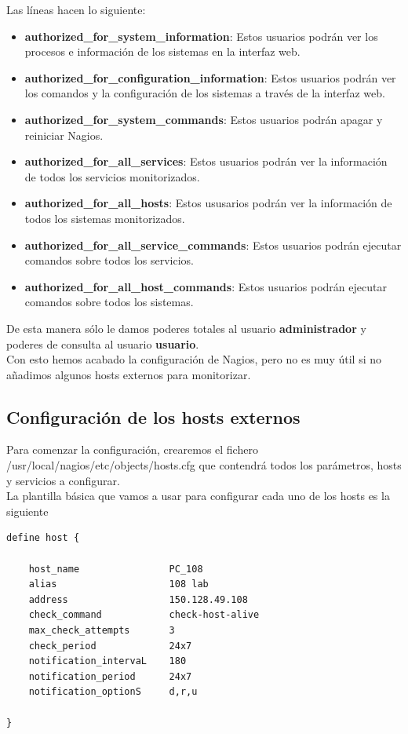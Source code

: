 \documentclass[11pt,a4paper]{article}
\begin{document}
Las líneas hacen lo siguiente:

\begin{itemize}
\item \textbf{authorized\_for\_system\_information}: Estos usuarios podrán ver los procesos e información de los sistemas en la interfaz web.
\item \textbf{authorized\_for\_configuration\_information}: Estos usuarios podrán ver los comandos y la configuración de los sistemas a través de la interfaz web.
\item \textbf{authorized\_for\_system\_commands}: Estos usuarios podrán apagar y reiniciar Nagios.
\item \textbf{authorized\_for\_all\_services}: Estos usuarios podrán ver la información de todos los servicios monitorizados.
\item \textbf{authorized\_for\_all\_hosts}: Estos ususarios podrán ver la información de todos los sistemas monitorizados.
\item \textbf{authorized\_for\_all\_service\_commands}: Estos usuarios podrán ejecutar comandos sobre todos los servicios.
\item \textbf{authorized\_for\_all\_host\_commands}: Estos usuarios podrán ejecutar comandos sobre todos los sistemas.
\end{itemize}

De esta manera sólo le damos poderes totales al usuario \textbf{administrador} y poderes de consulta al usuario \textbf{usuario}.
\\

Con esto hemos acabado la configuración de Nagios, pero no es muy útil si no añadimos algunos hosts externos para monitorizar.

\subsection{Configuración de los hosts externos}

Para comenzar la configuración, crearemos el fichero /usr/local/nagios/etc/objects/hosts.cfg que contendrá todos los parámetros, hosts y servicios a configurar.
\\

La plantilla básica que vamos a usar para configurar cada uno de los hosts es la siguiente

\begin{verbatim}
define host {

    host_name                PC_108
    alias                    108 lab
    address                  150.128.49.108
    check_command            check-host-alive
    max_check_attempts       3
    check_period             24x7
    notification_intervaL    180
    notification_period      24x7
    notification_optionS     d,r,u

}
\end{verbatim}
\end{document}
